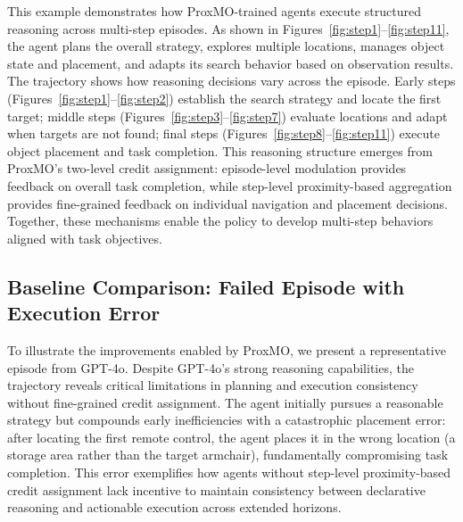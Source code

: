 \documentclass[11pt]{article}
\begin{document}
This example demonstrates how ProxMO-trained agents execute structured reasoning across multi-step episodes. As shown in Figures~\ref{fig:step1}--\ref{fig:step11}, the agent plans the overall strategy, explores multiple locations, manages object state and placement, and adapts its search behavior based on observation results. The trajectory shows how reasoning decisions vary across the episode. Early steps (Figures~\ref{fig:step1}--\ref{fig:step2}) establish the search strategy and locate the first target; middle steps (Figures~\ref{fig:step3}--\ref{fig:step7}) evaluate locations and adapt when targets are not found; final steps (Figures~\ref{fig:step8}--\ref{fig:step11}) execute object placement and task completion. This reasoning structure emerges from ProxMO's two-level credit assignment: episode-level modulation provides feedback on overall task completion, while step-level proximity-based aggregation provides fine-grained feedback on individual navigation and placement decisions. Together, these mechanisms enable the policy to develop multi-step behaviors aligned with task objectives.

\subsection{Baseline Comparison: Failed Episode with Execution Error}

To illustrate the improvements enabled by ProxMO, we present a representative episode from GPT-4o. Despite GPT-4o's strong reasoning capabilities, the trajectory reveals critical limitations in planning and execution consistency without fine-grained credit assignment. The agent initially pursues a reasonable strategy but compounds early inefficiencies with a catastrophic placement error: after locating the first remote control, the agent places it in the wrong location (a storage area rather than the target armchair), fundamentally compromising task completion. This error exemplifies how agents without step-level proximity-based credit assignment lack incentive to maintain consistency between declarative reasoning and actionable execution across extended horizons.
\end{document}
